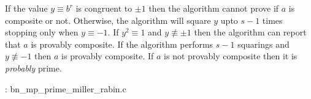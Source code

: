 \documentclass[b5paper]{book}
\def\nequiv{\not\equiv}
\begin{document}
If the value $y \equiv b^r$ is congruent to $\pm 1$ then the algorithm cannot prove if $a$ is composite or not.  Otherwise, the algorithm will
square $y$ upto $s - 1$ times stopping only when $y \equiv -1$.  If $y^2 \equiv 1$ and $y \nequiv \pm 1$ then the algorithm can report that $a$
is provably composite.  If the algorithm performs $s - 1$ squarings and $y \nequiv -1$ then $a$ is provably composite.  If $a$ is not provably 
composite then it is \textit{probably} prime.

\vspace{+3mm}\begin{small}
\hspace{-5.1mm}{\bf File}: bn\_mp\_prime\_miller\_rabin.c
\vspace{-3mm}
\begin{alltt}
\end{alltt}
\end{small}
\end{document}
